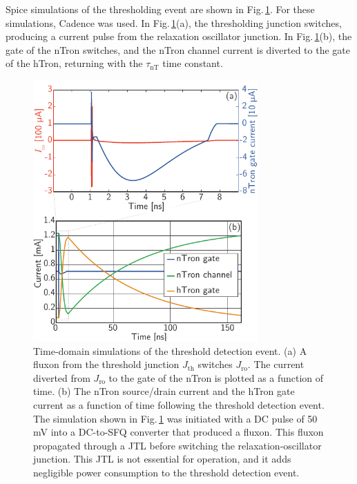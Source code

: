 \documentclass[twocolumn]{article}
\begin{document}
Spice simulations of the thresholding event are shown in Fig.\,\ref{fig:transmitters_jjTriggersNTron}. For these simulations, Cadence was used. In Fig.\,\ref{fig:transmitters_jjTriggersNTron}(a), the thresholding junction switches, producing a current pulse from the relaxation oscillator junction. In Fig.\,\ref{fig:transmitters_jjTriggersNTron}(b), the gate of the nTron switches, and the nTron channel current is diverted to the gate of the hTron, returning with the $\tau_{\mathrm{nT}}$ time constant. 
\begin{figure}[t!]
	\centerline{\includegraphics[width=8.6cm]{_transmitters_jjTriggersNTron_small.pdf}}
	\caption{\label{fig:transmitters_jjTriggersNTron}Time-domain simulations of the threshold detection event. (a) A fluxon from the threshold junction $J_{\mathrm{th}}$ switches $J_{\mathrm{ro}}$. The current diverted from $J_{\mathrm{ro}}$ to the gate of the nTron is plotted as a function of time. (b) The nTron source/drain current and the hTron gate current as a function of time following the threshold detection event. The simulation shown in Fig.\,\ref{fig:transmitters_jjTriggersNTron} was initiated with a DC pulse of 50\,mV into a DC-to-SFQ converter \cite{vatu1998,ka1999} that produced a fluxon. This fluxon propagated through a JTL before switching the relaxation-oscillator junction. This JTL is not essential for operation, and it adds negligible power consumption to the threshold detection event.}
\end{figure} 
\end{document}
